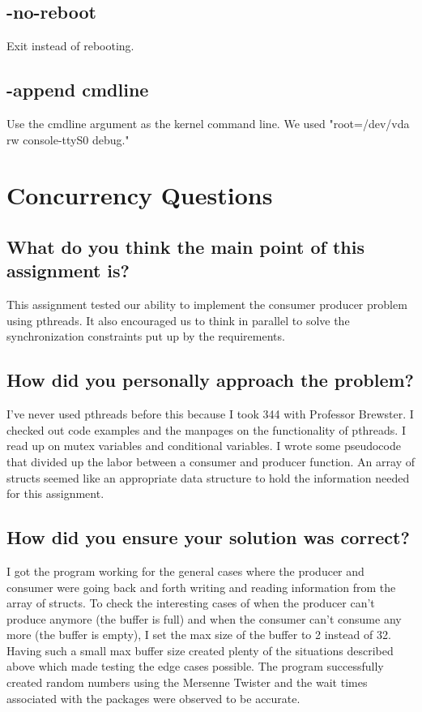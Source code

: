 \documentclass[letterpaper,
10pt, titlepage, draftclsnofoot, onecolumn]{IEEEtran}
\begin{document}
\subsection*{-no-reboot}
Exit instead of rebooting.

\subsection*{-append cmdline}
Use the cmdline argument as the kernel command line. We used "root=/dev/vda rw console-ttyS0 debug."

\section*{Concurrency Questions}

\subsection*{What do you think the main point of this assignment is?}

This assignment tested our ability to implement the consumer producer problem using pthreads. It also encouraged us to think in parallel to solve the synchronization constraints put up by the requirements.

\subsection*{How did you personally approach the problem?}

I've never used pthreads before this because I took 344 with Professor Brewster. I checked out code examples and the manpages on the functionality of pthreads. I read up on mutex variables and conditional variables. I wrote some pseudocode that divided up the labor between a consumer and producer function. An array of structs seemed like an appropriate data structure to hold the information needed for this assignment.

\subsection*{How did you ensure your solution was correct?}

I got the program working for the general cases where the producer and consumer were going back and forth writing and reading information from the array of structs. To check the interesting cases of when the producer can't produce anymore (the buffer is full) and when the consumer can't consume any more (the buffer is empty), I set the max size of the buffer to 2 instead of 32. Having such a small max buffer size created plenty of the situations described above which made testing the edge cases possible. The program successfully created random numbers using the Mersenne Twister and the wait times associated with the packages were observed to be accurate.
\end{document}
